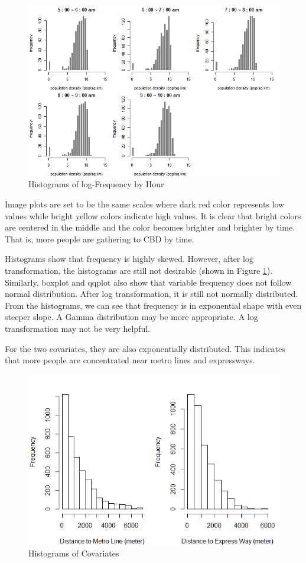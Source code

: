 \documentclass[hidelinks,12pt]{article}
\begin{document}
\FloatBarrier
	\begin{figure}[!ht]
		\includegraphics[width=\textwidth]{hist_log.png}
		\caption{Histograms of log-Frequency by Hour \label{fig:lghist}}
	\end{figure}

	Image plots are set to be the same scales where dark red color represents low values while bright yellow colors indicate high values. It is clear that bright colors are centered in the middle and the color becomes brighter and brighter by time. That is, more people are gathering to CBD by time.
	
	Histograms show that frequency is highly skewed. However, after log transformation, the histograms are still not desirable (shown in Figure \ref{fig:lghist}). Similarly, boxplot and qqplot also show that variable frequency does not follow normal distribution. After log transformation, it is still not normally distributed. From the histograms, we can see that frequency is in exponential shape with even steeper slope. A Gamma distribution may be more appropriate. A log transformation may not be very helpful.
	
	For the two covariates, they are also exponentially distributed. This indicates that more people are concentrated near metro lines and expressways.
	\begin{figure}[!ht]
		\includegraphics[width=\textwidth]{hist_x.png}
		\caption{Histograms of Covariates \label{fig:histx}}
	\end{figure}
\FloatBarrier
\end{document}
